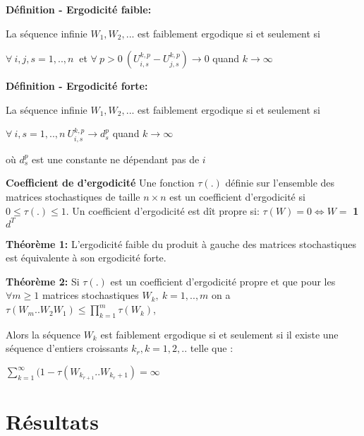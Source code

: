 \documentclass{beamer}
\begin{document}
\begin{frame}
	\textbf{Définition - Ergodicité faible:}
	
	La séquence infinie $W_1, W_2, ...$ est faiblement ergodique si et seulement si
	
	$ \forall\ i, j, s = 1,..,n\ $ et $\forall\ p > 0\ (U_{i,s}^{k,p} - U_{j,s}^{k,p}) \rightarrow 0$ quand $k \rightarrow \infty$
	
	\bigbreak

	\pause
	
	\textbf{Définition - Ergodicité forte:}
	
	La séquence infinie $W_1, W_2, ...$ est faiblement ergodique si et seulement si
	
	$ \forall\ i, s = 1,..,n\ U_{i,s}^{k,p} \rightarrow d_s^p$ quand $k \rightarrow \infty$
	
	où $d_s^p$ est une constante ne dépendant pas de $i$
	
\end{frame}

\begin{frame}
	\textbf{Coefficient de d'ergodicité}
		Une fonction $\tau(.)$ définie sur l'ensemble des matrices stochastiques de taille $n \times n$ est un coefficient d'ergodicité si $0 \leq \tau(.) \leq 1$.
		\bigbreak
		Un coefficient d'ergodicité est dît propre si:
		$\tau(W) = 0 \iff W = $ \textbf{1}$d^T$
		
\end{frame}


\begin{frame}
	\textbf{Théorème 1:}
		L'ergodicité faible du produit à gauche des matrices stochastiques est équivalente à son ergodicité forte.
	\bigbreak
	
	\pause

	\textbf{Théorème 2:}
		Si $\tau(.)$ est un coefficient d'ergodicité propre et que pour les $\forall m \geq 1$ matrices stochastiques $W_k,\ k=1,..,m$ on a $\tau(W_m .. W_2W_1) \leq \prod_{k=1}^m\tau(W_k)$,
		
	\pause	
	\bigbreak		
		
		Alors la séquence $W_k$ est faiblement ergodique si et seulement si il existe une séquence d'entiers croissants $k_r, k=1,2,..$ telle que :

			\bigbreak
			
			$\sum_{k=1}^{\infty}(1 - \tau(W_{k_{r+1}}..W_{k_r + 1}) = \infty$

\end{frame}

\section{Résultats}
	
\end{document}
